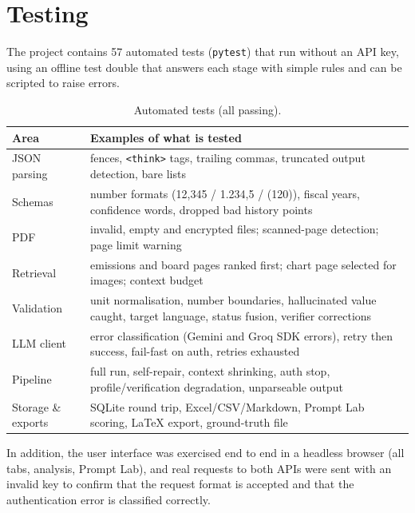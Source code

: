 \documentclass[11pt,a4paper]{article}
\newcommand{\code}[1]{\texttt{\small #1}}
\begin{document}
\section{Testing}\label{sec:tests}
The project contains 57 automated tests (\code{pytest}) that run without an API key, using an offline
test double that answers each stage with simple rules and can be scripted to raise errors.

\begin{table}[H]
\centering\small
\begin{tabularx}{\linewidth}{@{}lX@{}}
\toprule
\textbf{Area} & \textbf{Examples of what is tested}\\\midrule
JSON parsing & fences, \code{<think>} tags, trailing commas, truncated output detection, bare lists\\
Schemas & number formats (12,345 / 1.234,5 / (120)), fiscal years, confidence words, dropped bad history points\\
PDF & invalid, empty and encrypted files; scanned-page detection; page limit warning\\
Retrieval & emissions and board pages ranked first; chart page selected for images; context budget\\
Validation & unit normalisation, number boundaries, hallucinated value caught, target language, status fusion, verifier corrections\\
LLM client & error classification (Gemini and Groq SDK errors), retry then success, fail-fast on auth, retries exhausted\\
Pipeline & full run, self-repair, context shrinking, auth stop, profile/verification degradation, unparseable output\\
Storage \& exports & SQLite round trip, Excel/CSV/Markdown, Prompt Lab scoring, LaTeX export, ground-truth file\\
\bottomrule
\end{tabularx}
\caption{Automated tests (all passing).}
\end{table}
In addition, the user interface was exercised end to end in a headless browser (all tabs, analysis,
Prompt Lab), and real requests to both APIs were sent with an invalid key to confirm that the request format
is accepted and that the authentication error is classified correctly.

\end{document}
